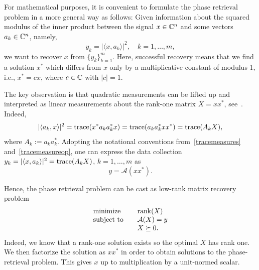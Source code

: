 For mathematical purposes, it is convenient to formulate the phase retrieval problem in a more general way as follows:
Given information about the squared modulus of the inner product
between the signal $x \in \mathbb{C}^n$ and some vectors $a_k \in \mathbb{C}^n$, namely,
\begin{equation}
\label{eq:data}
y_k = |\langle x,a_k\rangle |^2, \quad k = 1, \ldots, m,
\end{equation}
we want to recover $x$ from $\{y_k\}_{k=1}^m$. Here, successful recovery means that we find a solution $x^*$ which differs from $x$ only by a multiplicative constant of modulus 1, i.e., $x^* = cx$, where $c\in\mathbb{C}$ with $|c|=1$.

The key observation is that quadratic measurements can be lifted up and
interpreted as linear measurements about the rank-one matrix $X = x
x^*$, see~\cite{balan2009painless,CESV2013}. Indeed,
\begin{equation}\label{tracemeasurements}
|\langle a_k, x\rangle |^2 = \operatorname{trace}(x^* a_k a_k^* x) = \operatorname{trace}(a_k a_k^* x x^*) = \operatorname{trace}(A_k X),
\end{equation}
where $A_k := a_k a_k^*$.
Adopting the notational conventions from~\eqref{tracemeasures} and~\eqref{tracemeasureop}, one can
express the data collection $y_k = |\langle x, a_k\rangle |^2 =\operatorname{trace}(A_k X)$, $k=1,\dots,m$ as
\begin{equation}
y = \mathcal{A}(x x^*).
\end{equation}





Hence, the phase retrieval problem can be cast as low-rank matrix recovery problem~\cite{CSV2013,CESV2013}
\begin{equation}\label{eq:phaserank}
  \begin{array}{ll}
    \text{minimize}   & \quad \operatorname{rank}(X)\\
    \text{subject to} & \quad  {\mathcal A}(X) = y \\
& \quad X \succeq 0.
\end{array}
\end{equation}
Indeed, we know that a rank-one solution exists so the optimal $X$ has
rank one. We then factorize the solution as $x x^*$ in order
to obtain solutions to the phase-retrieval problem. This gives $x$ up
to multiplication by a unit-normed scalar.


